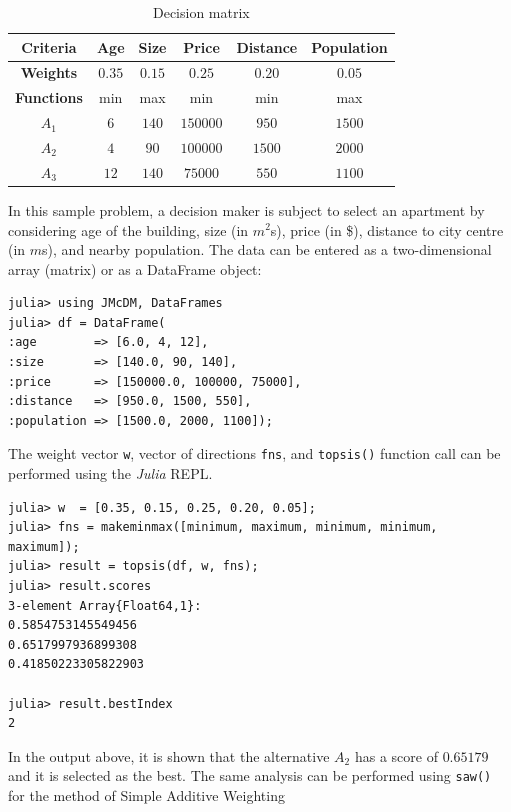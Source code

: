 \documentclass[preprint,review, 12pt, a4paper]{elsarticle}
\begin{document}
\begin{table}[H]
	\centering
	\begin{tabular}{|c|c|c|c|c|c|}
		\hline
		\textbf{Criteria} & {Age} & {Size} &  {Price} & {Distance} & {Population}\\
		\hline
		\textbf{Weights} & {$0.35$} & {$0.15$} & {$0.25$}& {$0.20$} & {$0.05$} \\
		\hline
		\textbf{Functions} & min  & max & min & min & max\\
		\hline
		\hline
		{$A_1$} & {$6$} & {$140$} & $150000$ & {$950$} & $1500$\\
		\hline
		{$A_2$} & {$4$} & {$90$} & $100000$ & {$1500$} & $2000$\\
		\hline
		{$A_3$} & {$12$} & {$140$} & $75000$ & {$550$} & $1100$\\
		\hline
	\end{tabular}
	\caption{Decision matrix}
	\label{table:example_problem} 
\end{table}

In this sample problem, a decision maker is subject to select an apartment by considering age of the building, size (in $m^2$s), price (in \$), distance to city centre (in $m$s), and nearby population.
The data can be entered as a two-dimensional array (matrix) or as a DataFrame object:

\begin{verbatim}
julia> using JMcDM, DataFrames
julia> df = DataFrame(
:age        => [6.0, 4, 12],
:size       => [140.0, 90, 140],
:price      => [150000.0, 100000, 75000],
:distance   => [950.0, 1500, 550],
:population => [1500.0, 2000, 1100]);
\end{verbatim}

\noindent The weight vector \texttt{w}, vector of directions \texttt{fns}, and \texttt{topsis()} function call can be performed using the \emph{Julia} REPL.

\begin{verbatim}
julia> w  = [0.35, 0.15, 0.25, 0.20, 0.05];
julia> fns = makeminmax([minimum, maximum, minimum, minimum, maximum]);
julia> result = topsis(df, w, fns);
julia> result.scores
3-element Array{Float64,1}:
0.5854753145549456
0.6517997936899308
0.41850223305822903

julia> result.bestIndex
2
\end{verbatim}

\noindent In the output above, it is shown that the alternative $A_2$ has a score of $0.65179$ and it is selected as the best. The same analysis can be performed using \texttt{saw()} for the method of Simple Additive Weighting
\end{document}
